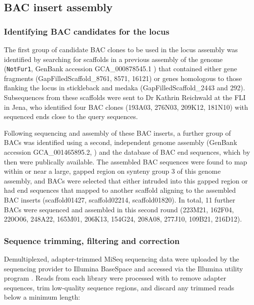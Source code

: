 \subsection{BAC insert assembly}
\label{sec:methods_comp_bacs}

\subsubsection{Identifying BAC candidates for the \nfu \igh{} locus}
\label{sec:methods_comp_bacs_ident}

The first group of candidate BAC clones \parencite{reichwald2015genome} to be used in the \Nfu locus assembly was identified by searching for scaffolds in a previous assembly of the \Nfu genome (\texttt{NotFur1}, GenBank accession GCA\_000878545.1 \parencite{valenzano2015genome}) that contained either \igh{} gene fragments (GapFilledScaffold\_8761, 8571, 16121) or genes homologous to those flanking the \igh{} locus in stickleback and medaka (GapFilledScaffold\_2443 and 292). Subsequences from these scaffolds were sent to Dr Kathrin Reichwald at the FLI in Jena, who identified four BAC clones (193A03, 276N03, 209K12, 181N10) with sequenced ends close to the query sequences.

Following sequencing and assembly of these BAC inserts, a further group of BACs was identified using a second, independent genome assembly (GenBank accession 	GCA\_001465895.2, \parencite{reichwald2015genome}) and the database of BAC end sequences, which by then were publically available. The assembled BAC sequences were found to map within or near a large, gapped region on synteny group 3 of this genome assembly, and BACs were selected that either intruded into this gapped region or had end sequences that mapped to another scaffold aligning to the assembled BAC inserts (scaffold01427, scaffold02214, scaffold01820). In total, 11 further BACs were sequenced and assembled in this second round (223M21, 162F04, 220O06, 248A22, 165M01, 206K13, 154G24, 208A08, 277J10, 109B21, 216D12).

\subsubsection{Sequence trimming, filtering and correction}
\label{sec:methods_comp_bacs_trim}

Demultiplexed, adapter-trimmed MiSeq sequencing data were uploaded by the sequencing provider to Illumina BaseSpace and accessed via the Illumina utility program . Reads from each library were processed with  \parencite{bolger2014trimmomatic} to remove adapter sequences, trim low-quality sequence regions, and discard any trimmed reads below a minimum length:

